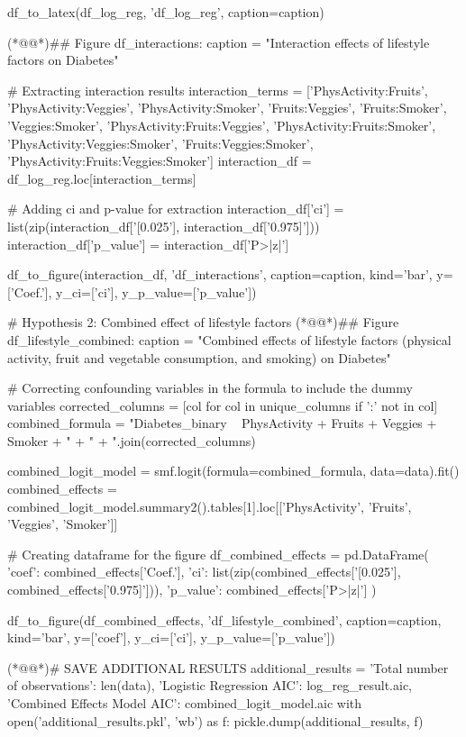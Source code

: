 \documentclass[11pt]{article}
\begin{document}
\begin{python}
df_to_latex(df_log_reg, 'df_log_reg', caption=caption)

(*@@*)## Figure df_interactions:
caption = "Interaction effects of lifestyle factors on Diabetes"

# Extracting interaction results
interaction_terms = ['PhysActivity:Fruits', 'PhysActivity:Veggies', 'PhysActivity:Smoker', 'Fruits:Veggies', 
                     'Fruits:Smoker', 'Veggies:Smoker', 'PhysActivity:Fruits:Veggies', 'PhysActivity:Fruits:Smoker', 
                     'PhysActivity:Veggies:Smoker', 'Fruits:Veggies:Smoker', 'PhysActivity:Fruits:Veggies:Smoker']
interaction_df = df_log_reg.loc[interaction_terms]

# Adding ci and p-value for extraction
interaction_df['ci'] = list(zip(interaction_df['[0.025'], interaction_df['0.975]']))
interaction_df['p_value'] = interaction_df['P>|z|']

df_to_figure(interaction_df, 'df_interactions', caption=caption, kind='bar', 
             y=['Coef.'], y_ci=['ci'], y_p_value=['p_value'])

# Hypothesis 2: Combined effect of lifestyle factors
(*@@*)## Figure df_lifestyle_combined:
caption = "Combined effects of lifestyle factors (physical activity, fruit and vegetable consumption, and smoking) on Diabetes"

# Correcting confounding variables in the formula to include the dummy variables
corrected_columns = [col for col in unique_columns if ':' not in col]
combined_formula = "Diabetes_binary ~ PhysActivity + Fruits + Veggies + Smoker + " + " + ".join(corrected_columns)

combined_logit_model = smf.logit(formula=combined_formula, data=data).fit()
combined_effects = combined_logit_model.summary2().tables[1].loc[['PhysActivity', 'Fruits', 'Veggies', 'Smoker']]

# Creating dataframe for the figure
df_combined_effects = pd.DataFrame({
    'coef': combined_effects['Coef.'],
    'ci': list(zip(combined_effects['[0.025'], combined_effects['0.975]'])),
    'p_value': combined_effects['P>|z|']
})

df_to_figure(df_combined_effects, 'df_lifestyle_combined', caption=caption, kind='bar', 
             y=['coef'], y_ci=['ci'], y_p_value=['p_value'])

(*@@*)# SAVE ADDITIONAL RESULTS
additional_results = {
    'Total number of observations': len(data),
    'Logistic Regression AIC': log_reg_result.aic,
    'Combined Effects Model AIC': combined_logit_model.aic 
}
with open('additional_results.pkl', 'wb') as f:
    pickle.dump(additional_results, f)

\end{python}
\end{document}
